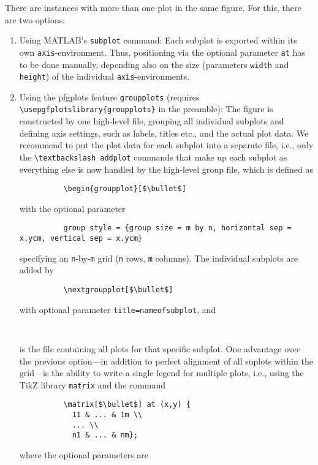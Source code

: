 \documentclass{article}
\begin{document}
There are instances with more than one plot in the same figure.
For this, there are two options:
%
\begin{enumerate}
	\item Using MATLAB's \verb|subplot| command: Each subplot is exported within its own \verb|axis|-environment. Thus, positioning via the optional parameter \verb|at| has to be done manually, depending also on the size (parameters \verb|width| and \verb|height|) of the individual \verb|axis|-environments.
	\item Using the pfgplots feature \verb|groupplots| (requires \verb|\usepgfplotslibrary{groupplots}| in the preamble): The figure is constructed by one high-level file, grouping all individual subplots and defining axis settings, such as labels, titles etc., and the actual plot data. We recommend to put the plot data for each subplot into a separate file, i.e., only the \verb|\textbackslash addplot| commands that make up each subplot as everything else is now handled by the high-level group file, which is defined as
		\begin{verbatim}
		  \begin{groupplot}[$\bullet$]
		\end{verbatim}
		with the optional parameter
		\begin{verbatim}
		  group style = {group size = m by n, horizontal sep = x.ycm, vertical sep = x.ycm}
		\end{verbatim}
		specifying an \verb|n|-by-\verb|m| grid (\verb|n| rows, \verb|m| columns). The individual subplots are added by
		\begin{verbatim}
		  \nextgroupplot[$\bullet$]
		\end{verbatim}
		with optional parameter \verb|title=nameofsubplot|, and
		\begin{verbatim}
		  
		\end{verbatim}
		is the file containing all plots for that specific subplot.
	One advantage over the previous option---in addition to perfect alignment of all suplots within the grid---is the ability to write a single legend for multiple plots, i.e., using the TikZ library \verb|matrix| and the command
		\begin{verbatim}
		  \matrix[$\bullet$] at (x,y) {
		    11 & ... & 1m \\
		    ... \\
		    n1 & ... & nm};
		\end{verbatim}
		where the optional parameters are
		\begin{verbatim}

\end{verbatim}
\end{enumerate}
\end{document}
